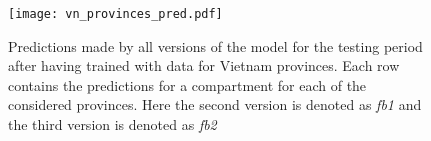 \begin{figure}[!htb]
    \centering
    \texttt{[image: vn\_provinces\_pred.pdf]}
    \caption{Predictions made by all versions of the model for the testing period after having trained with data for Vietnam provinces. Each row contains the predictions for a compartment for each of the considered provinces. Here the second version is denoted as \textit{fb1} and the third version is denoted as \textit{fb2}}
    \label{fig:pred-vn-provinces}
\end{figure}
